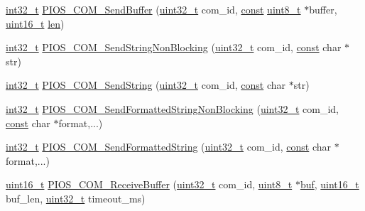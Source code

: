 \begin{DoxyCompactItemize}
\item 
\hyperlink{group___n_a_m_e_gafd12020da5a235dfcf0c3c748fb5baed}{int32\-\_\-t} \hyperlink{group___p_i_o_s___c_o_m_ga2570c1f2362c3eb7ae27f1ab9ec3354f}{P\-I\-O\-S\-\_\-\-C\-O\-M\-\_\-\-Send\-Buffer} (\hyperlink{stdint_8h_a435d1572bf3f880d55459d9805097f62}{uint32\-\_\-t} com\-\_\-id, \hyperlink{group___n_a_m_e_ga7ae6d0e43244213b34de2c2b9aa30da6}{const} \hyperlink{stdint_8h_aba7bc1797add20fe3efdf37ced1182c5}{uint8\-\_\-t} $\ast$buffer, \hyperlink{stdint_8h_a273cf69d639a59973b6019625df33e30}{uint16\-\_\-t} \hyperlink{mavlink__helpers_8h_aba59486c1504340293255a065b546e3a}{len})
\item 
\hyperlink{group___n_a_m_e_gafd12020da5a235dfcf0c3c748fb5baed}{int32\-\_\-t} \hyperlink{group___p_i_o_s___c_o_m_ga78e03d051621fae356ceef55689cd6b1}{P\-I\-O\-S\-\_\-\-C\-O\-M\-\_\-\-Send\-String\-Non\-Blocking} (\hyperlink{stdint_8h_a435d1572bf3f880d55459d9805097f62}{uint32\-\_\-t} com\-\_\-id, \hyperlink{group___n_a_m_e_ga7ae6d0e43244213b34de2c2b9aa30da6}{const} char $\ast$str)
\item 
\hyperlink{group___n_a_m_e_gafd12020da5a235dfcf0c3c748fb5baed}{int32\-\_\-t} \hyperlink{group___p_i_o_s___c_o_m_gacc2237dbbac1405a0da445b1e29b43b4}{P\-I\-O\-S\-\_\-\-C\-O\-M\-\_\-\-Send\-String} (\hyperlink{stdint_8h_a435d1572bf3f880d55459d9805097f62}{uint32\-\_\-t} com\-\_\-id, \hyperlink{group___n_a_m_e_ga7ae6d0e43244213b34de2c2b9aa30da6}{const} char $\ast$str)
\item 
\hyperlink{group___n_a_m_e_gafd12020da5a235dfcf0c3c748fb5baed}{int32\-\_\-t} \hyperlink{group___p_i_o_s___c_o_m_ga90ca4d65d6b74e69e2050d2a44bd7d85}{P\-I\-O\-S\-\_\-\-C\-O\-M\-\_\-\-Send\-Formatted\-String\-Non\-Blocking} (\hyperlink{stdint_8h_a435d1572bf3f880d55459d9805097f62}{uint32\-\_\-t} com\-\_\-id, \hyperlink{group___n_a_m_e_ga7ae6d0e43244213b34de2c2b9aa30da6}{const} char $\ast$format,...)
\item 
\hyperlink{group___n_a_m_e_gafd12020da5a235dfcf0c3c748fb5baed}{int32\-\_\-t} \hyperlink{group___p_i_o_s___c_o_m_gacc1a0f580700769ef2cd5fd1028c633a}{P\-I\-O\-S\-\_\-\-C\-O\-M\-\_\-\-Send\-Formatted\-String} (\hyperlink{stdint_8h_a435d1572bf3f880d55459d9805097f62}{uint32\-\_\-t} com\-\_\-id, \hyperlink{group___n_a_m_e_ga7ae6d0e43244213b34de2c2b9aa30da6}{const} char $\ast$format,...)
\item 
\hyperlink{stdint_8h_a273cf69d639a59973b6019625df33e30}{uint16\-\_\-t} \hyperlink{group___p_i_o_s___c_o_m_ga3a53bd031e1ef8cf2e63978872e97999}{P\-I\-O\-S\-\_\-\-C\-O\-M\-\_\-\-Receive\-Buffer} (\hyperlink{stdint_8h_a435d1572bf3f880d55459d9805097f62}{uint32\-\_\-t} com\-\_\-id, \hyperlink{stdint_8h_aba7bc1797add20fe3efdf37ced1182c5}{uint8\-\_\-t} $\ast$\hyperlink{mavlink__helpers_8h_af5c51bef7cca88bcb22f0517fdb06153}{buf}, \hyperlink{stdint_8h_a273cf69d639a59973b6019625df33e30}{uint16\-\_\-t} buf\-\_\-len, \hyperlink{stdint_8h_a435d1572bf3f880d55459d9805097f62}{uint32\-\_\-t} timeout\-\_\-ms)

\end{DoxyCompactItemize}
